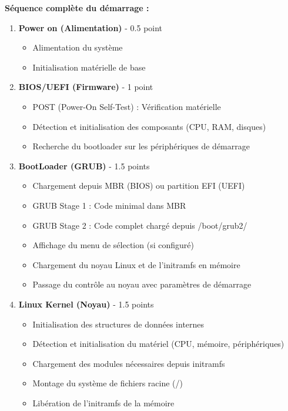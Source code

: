 \documentclass[12pt,a4paper]{article}
\begin{document}
\begin{answerbox}
\textbf{Séquence complète du démarrage :}

\begin{enumerate}
    \item \textbf{Power on (Alimentation)} - 0.5 point
    \begin{itemize}
        \item Alimentation du système
        \item Initialisation matérielle de base
    \end{itemize}
    
    \item \textbf{BIOS/UEFI (Firmware)} - 1 point
    \begin{itemize}
        \item POST (Power-On Self-Test) : Vérification matérielle
        \item Détection et initialisation des composants (CPU, RAM, disques)
        \item Recherche du bootloader sur les périphériques de démarrage
    \end{itemize}
    
    \item \textbf{BootLoader (GRUB)} - 1.5 points
    \begin{itemize}
        \item Chargement depuis MBR (BIOS) ou partition EFI (UEFI)
        \item GRUB Stage 1 : Code minimal dans MBR
        \item GRUB Stage 2 : Code complet chargé depuis /boot/grub2/
        \item Affichage du menu de sélection (si configuré)
        \item Chargement du noyau Linux et de l'initramfs en mémoire
        \item Passage du contrôle au noyau avec paramètres de démarrage
    \end{itemize}
    
    \item \textbf{Linux Kernel (Noyau)} - 1.5 points
    \begin{itemize}
        \item Initialisation des structures de données internes
        \item Détection et initialisation du matériel (CPU, mémoire, périphériques)
        \item Chargement des modules nécessaires depuis initramfs
        \item Montage du système de fichiers racine (/)
        \item Libération de l'initramfs de la mémoire
    \end{itemize}
    

\end{enumerate}
\end{answerbox}
\end{document}
